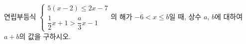 연립부등식 $\begin{cases} 5(x-2)\le 2x-7 \\ \dfrac{1}{2}x+1>\dfrac{a}{3}x-1 \end{cases}$의 해가 $-6<x\le b$일 때, 상수 $a$, $b$에 대하여 $a+b$의 값을 구하시오. 
